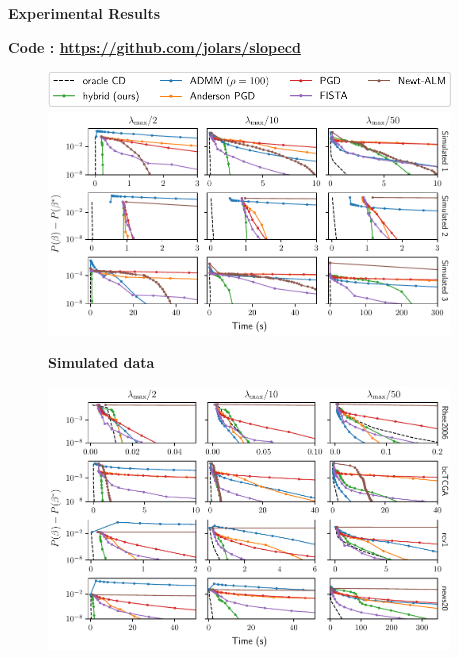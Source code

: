\documentclass[english,final,t]{beamer}
\begin{document}
\begin{frame}{}
\begin{columns}[t]
\begin{column}{.3\linewidth}
\begin{block}{\textbf{\color{malgared}{\# 3 Anderson Acceleration}}}
		\end{block}
	\end{column}
	\begin{column}{.3\linewidth}
		\begin{block}{\textbf{\color{malgared}Experimental Results}}
			\begin{center}
					\begin{minipage}{0.9\linewidth}
					\begin{beamerboxesrounded}[lower=headerCol]{}
						\textbf{Code : \url{https://github.com/jolars/slopecd}}
					\end{beamerboxesrounded}
				\end{minipage}
			\end{center}
			\begin{figure}[tb]
				\includegraphics[width=0.7\linewidth]{./images/simulated_legend.pdf}
				\includegraphics[width=0.8\linewidth]{./images/simulated.pdf}

				\textbf{Simulated data}
			\end{figure}
			\vspace{.5em}

			\begin{figure}[tb]
				\includegraphics[width=0.8\linewidth]{./images/real.pdf}


\end{figure}
\end{block}
\end{column}
\end{columns}
\end{frame}
\end{document}
